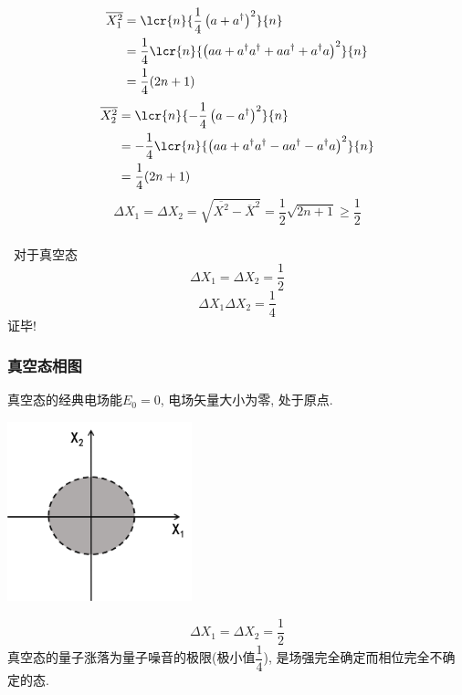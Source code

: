 \begin{frame}
  \frametitle{}
\[ 
\begin{aligned}
  \overline{X_1 ^2} &= \lcr{n}{\frac{1}{4}\left(a+a^{\dagger}\right)^2}{n} \\
        &= \frac{1}{4} \lcr{n}{\left(aa+a^{\dagger}a^{\dagger}+aa^{\dagger}+ a^{\dagger}a\right)^2}{n} \\
        &= \frac{1}{4} (2n+1)
\end{aligned}\]
\[
\begin{aligned}
  \overline{X_2 ^2} &= \lcr{n}{-\frac{1}{4}\left(a-a^{\dagger}\right)^2}{n} \\
  &= -\frac{1}{4} \lcr{n}{\left(aa+a^{\dagger}a^{\dagger}-aa^{\dagger}- a^{\dagger}a\right)^2}{n} \\
  &= \frac{1}{4} (2n+1)
\end{aligned}\]
\[ \Delta X_1 = \Delta X_2  =  \sqrt{ \overline{X^2}- \overline{X}^2} =\frac{1}{2}\sqrt{2n+1}\geq \frac{1}{2}\] 
\end{frame}

\begin{frame}
 \frametitle{}
  对于真空态
 \[ \Delta X_1 = \Delta X_2  = \frac{1}{2}\]
 \[ \Delta X_1 \Delta X_2  = \frac{1}{4}\]    
 证毕!\\ 
\end{frame}

\begin{frame}
 \frametitle{真空态相图}
真空态的经典电场能$E_0=0$, 电场矢量大小为零, 处于原点.  
      \begin{center}
         \includegraphics[width=0.4\textwidth]{figs/4.png}
      \end{center}
      \[ \Delta X_1 = \Delta X_2  = \frac{1}{2}\]
真空态的量子涨落为量子噪音的极限(极小值$\dfrac{1}{4}$), 是场强完全确定而相位完全不确定的态. 
\end{frame}


